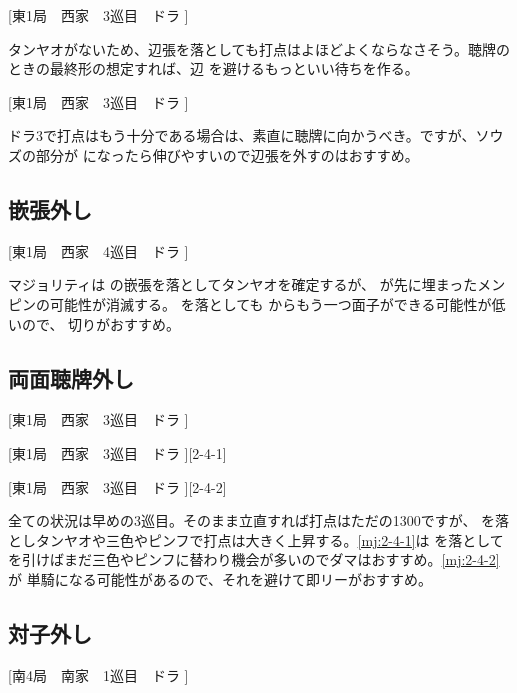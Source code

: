 \documentclass[10pt, twocolumn]{article}
\begin{document}
[東1局　西家　3巡目　ドラ ]

タンヤオがないため、辺張を落としても打点はよほどよくならなさそう。聴牌のときの最終形の想定すれば、辺  を避けるもっといい待ちを作る。

[東1局　西家　3巡目　ドラ ]

ドラ3で打点はもう十分である場合は、素直に聴牌に向かうべき。ですが、ソウズの部分が  になったら伸びやすいので辺張を外すのはおすすめ。

\subsection{嵌張外し}

[東1局　西家　4巡目　ドラ ]

マジョリティは  の嵌張を落としてタンヤオを確定するが、 が先に埋まったメンピンの可能性が消滅する。 を落としても  からもう一つ面子ができる可能性が低いので、 切りがおすすめ\citep[][pp. 92--97]{tetsusenryaku}。

\subsection{両面聴牌外し}

[東1局　西家　3巡目　ドラ ]

[東1局　西家　3巡目　ドラ ][2-4-1]

[東1局　西家　3巡目　ドラ ][2-4-2]

全ての状況は早めの3巡目。そのまま立直すれば打点はただの1300ですが、 を落としタンヤオや三色やピンフで打点は大きく上昇する。\ref{mj:2-4-1}は を落として  を引けばまだ三色やピンフに替わり機会が多いのでダマはおすすめ。\ref{mj:2-4-2}が  単騎になる可能性があるので、それを避けて即リーがおすすめ\citep[][pp. 68--73]{tetsusenryaku}。

\subsection{対子外し}

[南4局　南家　1巡目　ドラ ]
\end{document}
